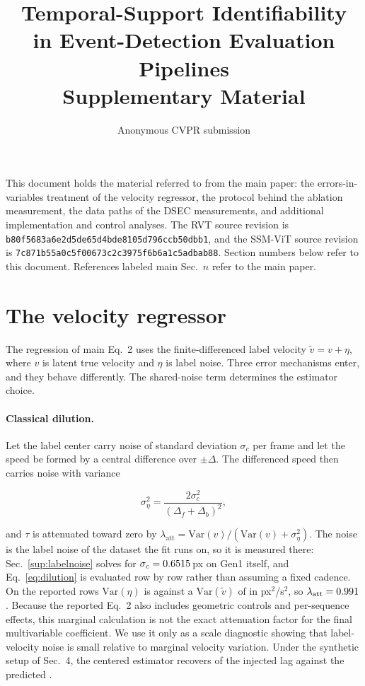 \documentclass[10pt,twocolumn,letterpaper]{article}
\title{Temporal-Support Identifiability\\
in Event-Detection Evaluation Pipelines\\[0.3em]
\large Supplementary Material}
\author{Anonymous CVPR submission}
\begin{document}
\maketitle

\noindent
This document holds the material referred to from the main paper: the
errors-in-variables treatment of the velocity regressor, the protocol behind the
ablation measurement, the data paths of the DSEC measurements, and additional
implementation and control analyses. The RVT source revision is
\texttt{b80f5683a6e2d5de65d4bde8105d796ccb50dbb1}, and the SSM-ViT source revision is
\texttt{7c871b55a0c5f00673c2c3975f6b6a1c5adbab88}. Section numbers below refer to this document. References labeled
main Sec.~$n$ refer to the main paper.

\section{The velocity regressor}
\label{sup:denominator}

The regression of main Eq.~2 uses the finite-differenced label velocity
$\tilde v=v+\eta$, where $v$ is latent true velocity and $\eta$ is label noise.
Three error mechanisms enter, and they behave differently. The shared-noise term
determines the estimator choice.

\paragraph{Classical dilution.} Let the label center carry noise of standard
deviation $\sigma_{c}$ per frame and let the speed be formed by a central
difference over $\pm\Delta$. The differenced speed then carries noise with variance

\begin{equation}
\sigma_{\eta}^{2}=\frac{2\sigma_{c}^{2}}{(\Delta_f+\Delta_b)^{2}},
\label{eq:dilution}
\end{equation}

and $\tau$ is attenuated toward zero by
$\lambda_{\mathrm{att}}=\mathrm{Var}(v)/(\mathrm{Var}(v)+\sigma_{\eta}^{2})$.
The noise is the label noise of the dataset the fit runs on, so it is measured
there: Sec.~\ref{sup:labelnoise} solves for $\sigma_{c}=0.6515$\,px on
Gen1 itself, and Eq.~\ref{eq:dilution} is evaluated row by row rather than
assuming a fixed cadence. On the
reported rows $\mathrm{Var}(\eta)$ is \eivVarNoise{} against a
$\mathrm{Var}(\tilde v)$ of \eivVarObs{} in px$^{2}$/s$^{2}$, so
$\lambda_{\mathrm{att}}=0.991{}$. Because the reported Eq.~2 also includes geometric
controls and per-sequence effects, this marginal calculation is not the exact attenuation
factor for the final multivariable coefficient. We use it only as a scale diagnostic showing
that label-velocity noise is small relative to marginal velocity variation. Under the synthetic
setup of Sec.~4, the centered estimator recovers \synRecover{} of the injected lag against the
predicted \synLambda{}.
\end{document}
